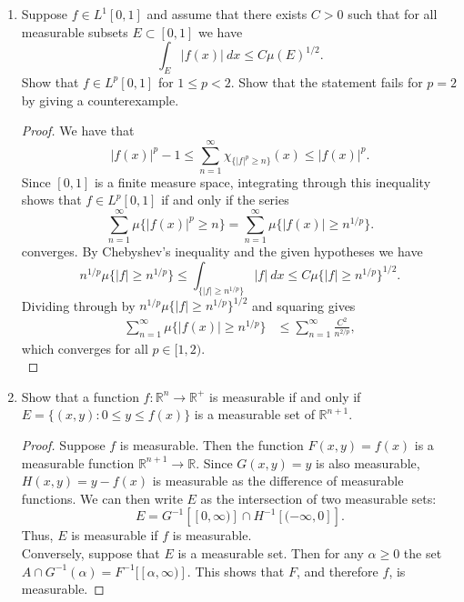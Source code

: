\documentclass[11pt,letterpaper]{report}
\newcommand{\reals}{\mathbb{R}}
\begin{document}
\begin{enumerate}
	\item Suppose $f\in L^1[0,1]$ and assume that there exists $C>0$ such that for all measurable subsets $E\subset [0,1]$ we have
	\[
	\int_E|f(x)|\ dx \leq C\mu(E)^{1/2}.
	\]
	Show that $f\in L^p[0,1]$ for $1\leq p<2$. Show that the statement fails for $p=2$ by giving a counterexample.
	\begin{proof}
		We have that
		\[
		|f(x)|^p-1 \leq \sum_{n=1}^\infty \chi_{\{|f|^p\geq n\}}(x) \leq |f(x)|^p.
		\]
		Since $[0,1]$ is a finite measure space, integrating through this inequality shows that $f\in L^p[0,1]$ if and only if the series
		\[
		\sum_{n=1}^\infty \mu\{|f(x)|^p\geq n\} = \sum_{n=1}^\infty \mu\{|f(x)|\geq n^{1/p}\}.
		\]
		converges. By Chebyshev's inequality and the given hypotheses we have
		\[
		n^{1/p}\mu\{|f|\geq n^{1/p}\} \leq \int_{\{|f|\geq n^{1/p}\}}|f|\ dx \leq C\mu\{|f|\geq n^{1/p}\}^{1/2}.
		\]
		Dividing through by $n^{1/p}\mu\{|f|\geq n^{1/p}\}^{1/2}$ and squaring gives
		\begin{align*}
		\sum_{n=1}^\infty \mu\{|f(x)|\geq n^{1/p}\} &\leq \sum_{n=1}^\infty \frac{C^2}{n^{2/p}},
		\end{align*}
		which converges for all $p\in [1, 2)$.\\

		\noindent 
	\end{proof}

	\item Show that a function $f: \reals^n\to \reals^+$ is measurable if and only if $E = \{(x,y): 0\leq y\leq f(x)\}$ is a measurable set of $\reals^{n+1}$.
	\begin{proof}
		Suppose $f$ is measurable. Then the function $F(x,y) = f(x)$ is a measurable function $\reals^{n+1}\to \reals$. Since $G(x,y)=y$ is also measurable, $H(x,y) = y-f(x)$ is measurable as the difference of measurable functions. We can then write $E$ as the intersection of two measurable sets:
		\[
		E = G^{-1}[[0,\infty)]\cap H^{-1}[(-\infty,0]].
		\]
		Thus, $E$ is measurable if $f$ is measurable.\\

		\noindent Conversely, suppose that $E$ is a measurable set. Then for any $\alpha\geq 0$ the set $A\cap G^{-1}(\alpha) = F^{-1}[[\alpha, \infty)]$. This shows that $F$, and therefore $f$, is measurable.
	\end{proof}


\end{enumerate}
\end{document}
